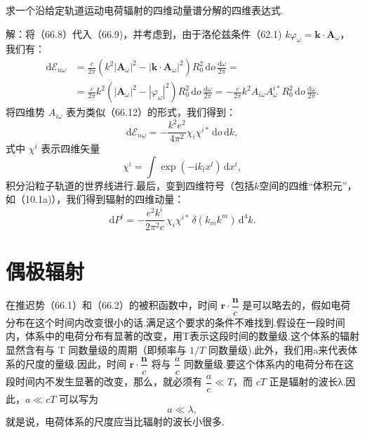 \begin{xiti}

\quad 求一个沿给定轨道运动电荷辐射的四维动量谱分解的四维表达式.

解：将（66.8）代入（66.9)，并考虑到，由于洛伦兹条件（62.1) $k\varphi_\omega=\boldsymbol{k}\cdot\boldsymbol{A}_\omega$，我们有：
\begin{equation*}
\begin{aligned}
  \mathrm{d}\mathcal{E}_{n\omega}&=\frac{c}{2\pi}\left(k^2|\boldsymbol{A}_\omega|^2-|\boldsymbol{k}\cdot\boldsymbol{A}_\omega|^2\right)R_0^2\,\mathrm{d}o\,\frac{\mathrm{d}\omega}{2\pi}=\\
  &=\frac{c}{2\pi}k^2\left(|\boldsymbol{A}_\omega|^2-|\varphi_\omega|^2\right)R_0^2\,\mathrm{d}o\,\frac{\mathrm{d}\omega}{2\pi}
  =-\frac{c}{2\pi}k^2A_{i\omega}A_\omega^{i*}R_0^2\,\mathrm{d}o\,\frac{\mathrm{d}\omega}{2\pi}.
\end{aligned}
\end{equation*}
将四维势 $A_{i\omega}$ 表为类似（66.12）的形式，我们得到：
\begin{equation*}
  \mathrm{d}\mathcal{E}_{n\omega}=-\frac{k^2e^2}{4\pi^2}\chi_i\chi^{i*}\,\mathrm{d}o\,\mathrm{d}k,
\end{equation*}
式中 $\chi^i$ 表示四维矢量
\begin{equation*}
  \chi^i=\int\exp(-\mathrm{i}k_l x^l)\,\mathrm{d}x^i,
\end{equation*}
积分沿粒子轨道的世界线进行.最后，变到四维符号（包括$k$空间的四维“体积元”，如（10.1a)），我们得到辐射的四维动量：
\begin{equation*}
  \mathrm{d}P^i=-\frac{e^2k^i}{2\pi^2c}\,\chi_i\chi^{i*}\,\delta(k_mk^m)\,\mathrm{d}^4k.
\end{equation*}

\end{xiti}

\section{偶极辐射}

在推迟势（66.1）和（66.2）的被积函数中，时间 $\boldsymbol{r}\cdot\dfrac{\boldsymbol{n}}{c}$ 是可以略去的，假如电荷分布在这个时间内改变很小的话.满足这个要求的条件不难找到.假设在一段时间内，体系中的电荷分布有显著的改变，用T表示这段时间的数量级.这个体系的辐射显然含有与 T 同数量级的周期（即频率与 $1/T$ 同数量级).此外，我们用a来代表体系的尺度的量级.因此，时间 $\boldsymbol{r}\cdot\dfrac{\boldsymbol{n}}{c}$ 将与 $\dfrac{a}{c}$ 同数量级.要这个体系内的电荷分布在这段时间内不发生显著的改变，那么，就必须有 $\dfrac{a}{c}\ll T$，而 $cT$ 正是辐射的波长λ.因此，$a\ll cT$ 可以写为
\begin{equation}
  a\ll\lambda,
\end{equation}
就是说，电荷体系的尺度应当比辐射的波长小很多.

